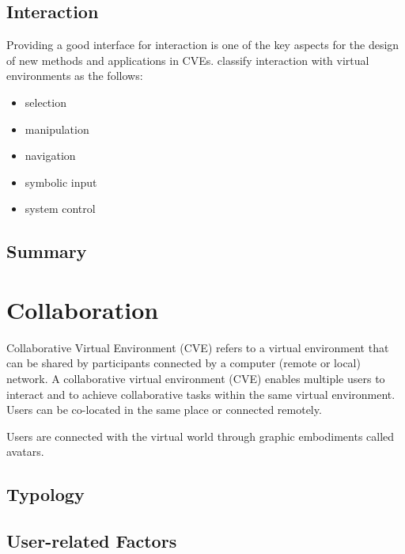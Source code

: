 \subsection{Interaction}
Providing a good interface for interaction is one of the key aspects for the design of new methods and applications in CVEs.
\citet{Bowman2004UIT} classify interaction with virtual environments as the follows:

\begin{itemize}
\item selection
\item manipulation
\item navigation
\item symbolic input
\item system control
\end{itemize}


\subsection{Summary}

\section{Collaboration}
Collaborative Virtual Environment (CVE) refers to a virtual environment that can be shared by participants connected by a computer (remote or local) network. A collaborative virtual environment (CVE) \citep{Benford2001CVE} enables multiple users to interact \citep{Schroeder2006Usability} and to achieve collaborative tasks \citep{Dodds2009Using} within the same virtual environment. Users can be co-located in the same place or connected remotely.

Users are connected with the virtual world through graphic embodiments called avatars.



\subsection{Typology}

\subsection{User-related Factors}

